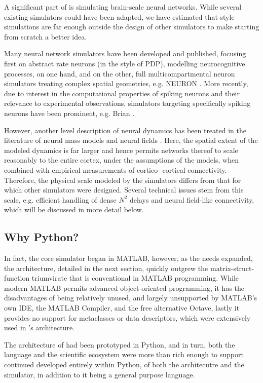 A significant part of \TVB is simulating brain-scale neural networks. While
several existing simulators could have been adapted, we have estimated that
\TVB style simulations are far enough outside the design of other simulators to
make starting from scratch a better idea.

Many neural network simulators have been developed and published, focusing
first on abstract rate neurons (in the style of PDP), modelling neurocognitive
processes, on one hand, and on the other, full multicompartmental neuron
simulators treating complex spatial geometries, e.g. NEURON \cite{Hines_2001}.
More recently, due to interest in the computational properties of spiking 
neurons and their relevance to experimental observations, simulators targeting
specifically spiking neurons have been prominent, e.g. Brian 
\cite{Goodman_2009}.

However, another level description of neural dynamics has been treated
in the literature of neural mass models and neural fields 
\cite{Deco_2008a, Coombes_2010}. Here, the spatial
extent of the modeled dynamics is far larger and hence permits networks 
thereof to scale reasonably to the entire cortex, under the assumptions 
of the models, when combined with empirical measurements of cortico-
cortical connectivity. Therefore, the physical scale modeled by the \TVB
simulators differs from that for which other simulators were designed.
Several technical issues stem from this scale, e.g. efficient handling
of dense $N^2$ delays and neural field-like connectivity, which will be
discussed in more detail below. 

\subsection{Why Python?}

In fact, the core simulator began in MATLAB, however, as the needs 
expanded, the architecture, detailed in the next section, quickly 
outgrew the matrix-struct-function triumvirate that is conventional
in MATLAB programming. While modern MATLAB permits advanced object-oriented
programming, it has the disadvantages of being relatively unused, and
largely unsupported by MATLAB's own IDE, the MATLAB Compiler, and the free
alternative Octave, lastly it provides no support for metaclasses or data
descriptors, which were extensively used in \TVB's architecture.

The architecture of \TVB had been prototyped in Python, and in turn, both the
language and the scientific ecosystem were more than rich enough to support
continued developed entirely within Python, of both the architecutre and the
simulator, in addition to it being a general purpose language. 

